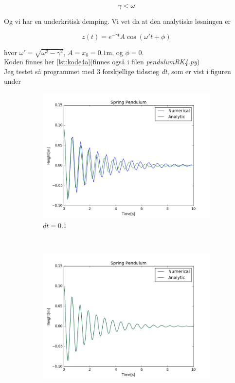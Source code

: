 \documentclass[a4paper,norsk, 10pt]{article}
\begin{document}
$$
\gamma < \omega
$$

Og vi har en underkritisk demping. Vi vet da at den analytiske løsningen er 

$$
z(t) = e^{-\gamma t}A\cos(\omega' t + \phi)
$$

hvor $\omega' = \sqrt{\omega^2 - \gamma^2} $, $A = x_0 = 0.1$m, og $\phi = 0$.\\

Koden finnes her \ref{lst:kode4a}(finnes også i filen \textit{pendulumRK4.py})\\

Jeg testet så programmet med 3 forskjellige tidssteg \textit{dt}, som er vist i figuren under

\begin{figure}[H]
    \centering
    \begin{subfigure}[b]{0.3\textwidth}
        \includegraphics[width=\textwidth]{dt01.png}
        \caption{$dt = 0.1$}
        \label{fig:dt01}
    \end{subfigure}
    ~ %
    \begin{subfigure}[b]{0.3\textwidth}
        \includegraphics[width=\textwidth]{dt001.png}

\end{subfigure}
\end{figure}
\end{document}

